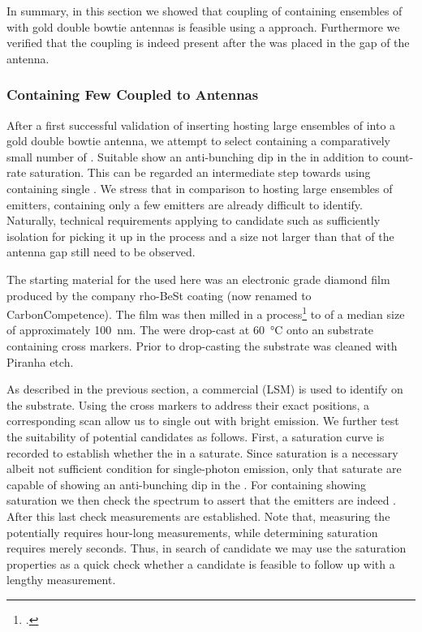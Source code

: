 			In summary, in this section we showed that coupling of \nds containing ensembles of \sivs with gold double bowtie antennas is feasible using a \pp approach. Furthermore we verified that the coupling is indeed present after the \nd was placed in the gap of the antenna.

		\FloatBarrier

		\subsubsection{\Nds Containing Few \SIVS Coupled to Antennas} \label{subsubsec::antenna_single_siv}

				After a first successful validation of inserting \nds hosting large ensembles of \sivs into a gold double bowtie antenna, we attempt to select \nds containing a comparatively small number of \sivs. Suitable \nds show an anti-bunching dip in the \gtf in addition to count-rate saturation. This can be regarded an intermediate step towards using \nds containing single \sivs. We stress that in comparison to \nds hosting large ensembles of emitters, \nds containing only a few emitters are already difficult to identify. Naturally, technical requirements applying to candidate \nds such as sufficiently isolation for picking it up in the \pp process and a size not larger than that of the antenna gap still need to be observed.
				
				The starting material for the \nds used here was an electronic grade diamond film produced by the company rho-BeSt coating (now renamed to CarbonCompetence).
				The film was then milled in a \basd process\footnote{\krueger.} to \nds of a median size of approximately \SI{100}{nm}.
				The \nds were drop-cast at \SI{60}{\celsius} onto an \ir substrate containing cross markers. Prior to drop-casting the substrate was cleaned with Piranha etch.
			
				As described in the previous section, a commercial \lsm (LSM) is used to identify \nds on the substrate. Using the cross markers to address their exact positions, a corresponding \fl scan allow us to single out \nds with bright emission. We further test the suitability of potential candidates as follows. First, a saturation curve is recorded to establish whether the \sivs in a \nd saturate. Since saturation is a necessary albeit not sufficient condition for single-photon emission, only \nds that saturate are capable of showing an anti-bunching dip in the \gtf. For \nds containing \sivs showing saturation we then check the spectrum to assert that the emitters are indeed \sivs. After this last check \gtf measurements are established. Note that, measuring the \gtf potentially requires hour-long measurements, while determining saturation requires merely seconds. Thus, in search of candidate \nds we may use the saturation properties as a quick check whether a candidate is feasible to follow up with a lengthy \gtf measurement.
				
